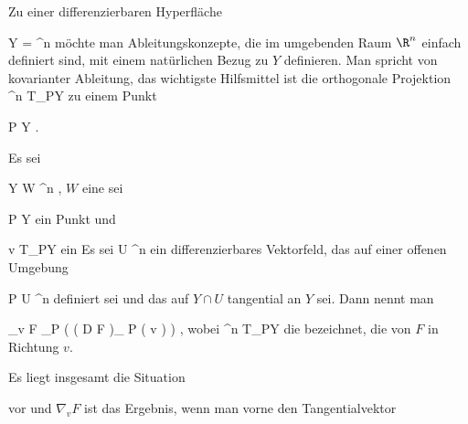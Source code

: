 \setcounter{section}{6}


Zu einer differenzierbaren Hyperfläche

\mavergleichskette
{\vergleichskette
{ Y
}
{ = }{ \R^n
}
{  }{
}
{    }{
}
{   }{
}
}
{}{}{}
möchte man Ableitungskonzepte, die im umgebenden Raum $\R^n$ einfach definiert sind, mit einem natürlichen Bezug zu $Y$ definieren. Man spricht von kovarianter Ableitung, das wichtigste Hilfsmittel ist die orthogonale Projektion
 {\R^n } { T_PY
} {}
zu einem Punkt

\mavergleichskette
{\vergleichskette
{ P
}
{ \in }{ Y
}
{  }{
}
{    }{
}
{   }{
}
}
{}{}{.}

{}
{

Es sei

\mavergleichskette
{\vergleichskette
{ Y
}
{ \subseteq }{ W
}
{ \subseteq }{ \R^n
}
{    }{
}
{   }{
}
}
{}{}{,}
$W$
eine
sei

\mavergleichskette
{\vergleichskette
{ P
}
{ \in }{ Y
}
{  }{
}
{    }{
}
{   }{
}
}
{}{}{}
ein Punkt und

\mavergleichskette
{\vergleichskette
{ v
}
{ \in }{ T_PY
}
{  }{
}
{    }{
}
{   }{
}
}
{}{}{}
ein
Es sei
 { U} { \R^n
} {}
ein differenzierbares Vektorfeld, das auf einer offenen Umgebung

\mavergleichskette
{\vergleichskette
{ P
}
{ \in }{ U
}
{ \subseteq }{ \R^n
}
{    }{
}
{   }{
}
}
{}{}{}
definiert sei und das auf $Y \cap U$  tangential an $Y$ sei. Dann nennt man

\mavergleichskettedisp
{\vergleichskette
{ \nabla_v F
}
{ } { \pi_P   \left(  \left(  D F   \right)_{ P } \left(  v  \right)  \right)
}
{ } {
}
{ } {
}
{ } {
}
}
{}{}{,}
wobei
 {\R^n } { T_PY
} {}
die
bezeichnet, die
von $F$ in Richtung $v$.

}

Es liegt insgesamt die Situation

 {  }

vor und $\nabla_v F$ ist das Ergebnis, wenn man vorne den Tangentialvektor

